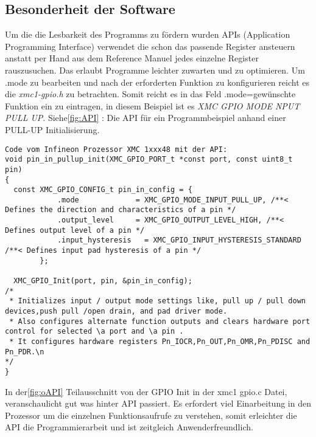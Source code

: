 \subsection{Besonderheit der Software}
Um die die Lesbarkeit des Programms zu fördern wurden APIs (Application Programming Interface) verwendet die schon das passende Register ansteuern anstatt per Hand aus dem Reference Manuel jedes einzelne Register rauszusuchen. Das erlaubt Programme leichter zuwarten und zu optimieren.
Um .mode zu bearbeiten und nach der erforderten Funktion zu konfigurieren reicht es die  \textit {xmc1-gpio.h} zu betrachten. Somit reicht es in das Feld .mode=gewünschte Funktion ein zu eintragen, in diesem Beispiel ist es \textit{XMC GPIO MODE NPUT PULL UP}.
Siehe\ref{fig:API} : Die API für ein Programmbeispiel anhand einer PULL-UP Initialisierung.
\\
\begin{minipage}{1\textwidth}
\begin{lstlisting}
Code vom Infineon Prozessor XMC 1xxx48 mit der API:
void pin_in_pullup_init(XMC_GPIO_PORT_t *const port, const uint8_t pin)
{
  const	XMC_GPIO_CONFIG_t pin_in_config = {
  			.mode             = XMC_GPIO_MODE_INPUT_PULL_UP, /**< Defines the direction and characteristics of a pin */
  			.output_level     = XMC_GPIO_OUTPUT_LEVEL_HIGH, /**< Defines output level of a pin */
  			.input_hysteresis	= XMC_GPIO_INPUT_HYSTERESIS_STANDARD /**< Defines input pad hysteresis of a pin */
  		};

  XMC_GPIO_Init(port, pin, &pin_in_config);
/*
 * Initializes input / output mode settings like, pull up / pull down devices,push pull /open drain, and pad driver mode.
 * Also configures alternate function outputs and clears hardware port control for selected \a port and \a pin .
 * It configures hardware registers Pn_IOCR,Pn_OUT,Pn_OMR,Pn_PDISC and Pn_PDR.\n
*/
}
\end{lstlisting}
\label{fig:API}
\end{minipage}

 In der\ref{fig:oAPI} Teilausschnitt von der GPIO Init in der xmc1 gpio.c Datei, veranschaulicht gut was hinter API passiert. Es erfordert viel Einarbeitung in den Prozessor um die einzelnen Funktionsaufrufe zu verstehen, somit erleichter die API die Programmierarbeit und ist zeitgleich Anwenderfreundlich.


